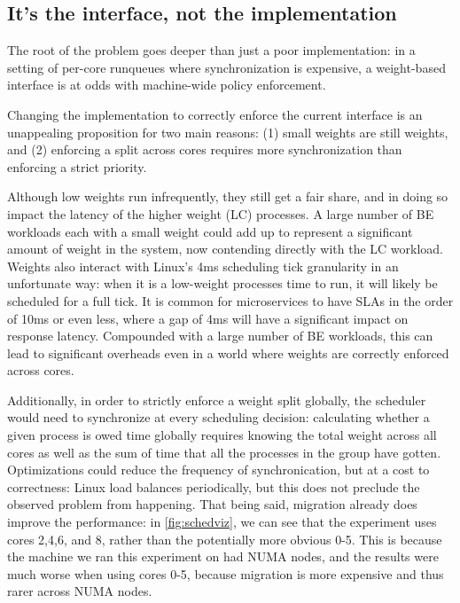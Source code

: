 \subsection{It's the interface, not the implementation}

The root of the problem goes deeper than just a poor implementation: in a
setting of per-core runqueues where synchronization is expensive, a weight-based
interface is at odds with machine-wide policy enforcement.

Changing the implementation to correctly enforce the current interface is an
unappealing proposition for two main reasons: (1) small weights are still
weights, and (2) enforcing a split across cores requires more synchronization
than enforcing a strict priority.

Although low weights run infrequently, they still get a fair share, and in doing
so impact the latency of the higher weight (LC) processes. A large number of BE
workloads each with a small weight could add up to represent a significant
amount of weight in the system, now contending directly with the LC workload.
Weights also interact with Linux's 4ms scheduling tick granularity in an
unfortunate way: when it is a low-weight processes time to run, it will
likely be scheduled for a full tick. It is common for microservices to have SLAs
in the order of 10ms or even less, where a gap of 4ms will have a significant
impact on response latency. Compounded with a large number of BE workloads, this
can lead to significant overheads even in a world where weights are correctly
enforced across cores.

Additionally, in order to strictly enforce a weight split globally, the
scheduler would need to synchronize at every scheduling decision: calculating
whether a given process is owed time globally requires knowing the total weight
across all cores as well as the sum of time that all the processes in the group
have gotten. Optimizations could reduce the frequency of synchronication, but at
a cost to correctness: Linux load balances periodically, but this does not
preclude the observed problem from happening. That being said, migration already
does improve the performance: in \autoref{fig:schedviz}, we can see that the
experiment uses cores 2,4,6, and 8, rather than the potentially more obvious
0-5. This is because the machine we ran this experiment on had NUMA nodes, and
the results were much worse when using cores 0-5, because migration is more
expensive and thus rarer across NUMA nodes.




